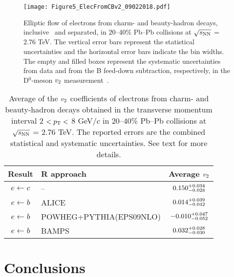 \documentclass[11pt,a4paper]{article}
\providecommand{\vtwo}{$v_{\rm 2}$ }
\providecommand{\snn}{$\sqrt{s_{\rm NN}}$ }
\begin{document}
\begin{figure}
\centering
    \texttt{[image: Figure5\_ElecFromCBv2\_09022018.pdf]}
  \caption{Elliptic flow of electrons from charm- and beauty-hadron decays, inclusive~\cite{Adam:2016ssk} and separated, in 20--40\%  Pb--Pb collisions at \snn = 2.76 TeV. The vertical error bars represent the statistical uncertainties and the horizontal error bars indicate the bin widths.  The empty and filled boxes represent the systematic uncertainties from data and from the B feed-down subtraction, respectively, in the D$^0$-meson \vtwo measurement~\cite{Abelev:2014ipa}.}  
   \label{fig:v2_ComparisonOfAllDecays}
\end{figure}

\begin{table}
\renewcommand{\arraystretch}{1.5}
\setlength{\tabcolsep}{4pt}
\centering
\begin{tabular}{ c l c }
\hline  \hline
Result & R approach & Average \vtwo \\
\hline \hline
$e \leftarrow c$ &  -- & $\rm 0.150_{\rm - 0.028}^{\rm + 0.034}$ \\
$e \leftarrow b$ & ALICE & $\rm 0.014 _{\rm - 0.042}^{\rm + 0.039}$  \\
$e \leftarrow b$ & POWHEG+PYTHIA(EPS09NLO) & $\rm -0.010 _{\rm - 0.052}^{\rm + 0.047}$  \\
$e \leftarrow b$ & BAMPS & $\rm 0.032_{\rm - 0.030}^{\rm + 0.028}$ \\
\hline  \hline
\end{tabular}
  \caption{Average of the \vtwo coefficients of electrons from  charm- and beauty-hadron decays obtained in the  transverse momentum interval  2 $<  p_{\rm T} <$ 8 GeV/$c$ in 20--40\%  Pb--Pb collisions at \snn = 2.76 TeV. The reported errors are the combined   statistical and systematic uncertainties. See text for more details.}
\label{tab:IntV2}
\end{table}






\section{Conclusions}
\label{Sec:Conclusions}
 
\end{document}
